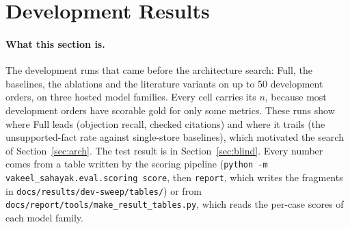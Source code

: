 \section{Development Results}
\label{sec:results}

\paragraph{What this section is.} The development runs that came before the architecture search: Full, the baselines, the ablations and the literature variants on up to 50 development orders, on three hosted model families. Every cell carries its $n$, because most development orders have scorable gold for only some metrics. These runs show where Full leads (objection recall, checked citations) and where it trails (the unsupported-fact rate against single-store baselines), which motivated the search of Section~\ref{sec:arch}. The test result is in Section~\ref{sec:blind}. Every number comes from a table written by the scoring pipeline (\texttt{python -m vakeel\_sahayak.eval.scoring score}, then \texttt{report}, which writes the fragments in \texttt{docs/results/dev-sweep/tables/}) or from \texttt{docs/report/tools/make\_result\_tables.py}, which reads the per-case scores of each model family.


